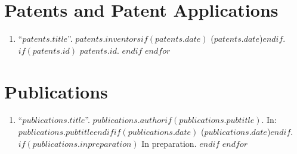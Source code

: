 \documentclass[11pt]{article}
\begin{document}
\section*{Patents and Patent Applications}
\begin{enumerate}
$for(patents)$
\item ``$patents.title$''. $patents.inventors$$if(patents.date)$ ($patents.date$)$endif$.
$if(patents.id)$
$patents.id$.
$endif$
$endfor$
\end{enumerate}

\section*{Publications}
\begin{enumerate}
$for(publications)$
\item ``\href{$publications.link$}{$publications.title$}''. $publications.author$$if(publications.pubtitle)$. In: \emph{$publications.pubtitle$}$endif$$if(publications.date)$ ($publications.date$)$endif$.
$if(publications.inpreparation)$
In preparation.
$endif$
$endfor$
\end{enumerate}
\end{document}
